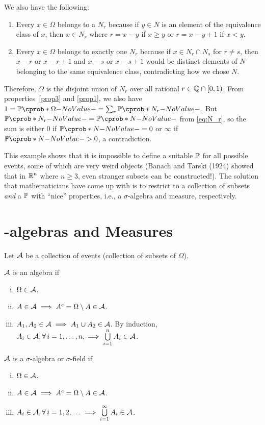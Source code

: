 \documentclass[12pt]{article}
\begin{document}
\begin{Example}
We also have the following:
\begin{enumerate}
	\item Every $x\in\Omega$ belongs to a $N_r$ because if $y\in N$ is an element of the equivalence class of $x$, then $x \in N_r$ where $r = x-y$ if $x\geq y$ or $r=x-y+1$ if $x<y$. 
	\item Every $x\in\Omega$ belongs to exactly one $N_r$ because if $x\in N_r\cap N_s$ for $r\ne s$, then $x-r$ or $x-r+1$ and $x-s$ or $x-s+1$ would be distinct elements of $N$ belonging to the same equivalence class, contradicting how we chose $N$. 
\end{enumerate}
Therefore, $\Omega$ is the disjoint union of $N_r$ over all rational $r\in \mathbb{Q}\cap [0,1)$. From properties~\ref{prop3} and \ref{prop1}, we also have $1 = \P(\Omega) = \sum_r \P(N_r)$. But $\P(N_r)=\P(N)$ from \cref{eq:N_r}, so the sum is either $0$ if $\P(N)=0$ or $\infty$ if $\P(N)>0$, a contradiction. 

This example shows that it is impossible to define a suitable $\P$ for all possible events, some of which are very weird objects (Banach and Tarski (1924) showed that in $\mathbb{R}^n$ where $n\geq3$, even stranger subsets can be constructed!). The solution that mathematicians have come up with is to restrict to a collection of subsets \emph{and} a $\P$ with ``nice'' properties, i.e., a $\sigma$-algebra and measure, respectively. 
\end{Example}

\section{-algebras and Measures}
Let $\mathcal{A}$ be a collection of events (collection of subsets of $\Omega$). 

\begin{Definition}
$\mathcal{A}$ is an algebra if
\begin{enumerate}[(i)]
\item $\Omega \in \mathcal{A}$.
\item $A \in \mathcal{A} \implies A^c = \Omega \setminus A \in \mathcal{A}$.
\item $A_1, A_2 \in \mathcal{A} \implies A_1 \cup A_2 \in \mathcal{A}$. By induction, $A_i \in \calA, \forall i = 1, \ldots, n, \implies \bigcup\limits_{i=1}^{n} A_i \in \calA$.
\end{enumerate}
\end{Definition}

\begin{Definition}
$\mathcal{A}$ is a $\sigma$-algebra or $\sigma$-field if
\begin{enumerate}[(i)]
\item $\Omega \in \mathcal{A}$.
\item $A \in \mathcal{A} \implies A^c = \Omega \setminus A \in \mathcal{A}$.
\item $A_i \in \calA, \forall i = 1, 2, \ldots \implies \bigcup\limits_{i=1}^{\infty} A_i \in \calA$.
\end{enumerate}
\end{Definition}
\end{document}
